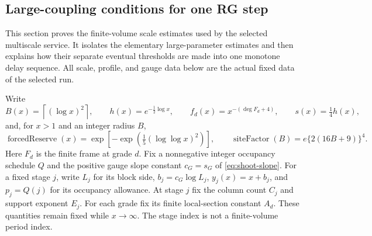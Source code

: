 \subsection{Large-coupling conditions for one RG step}
\label{ex-centered-geyser-scale-estimates}

This section proves the finite-volume scale estimates used by the selected multiscale service. It isolates the elementary large-parameter estimates and then explains how their separate eventual thresholds are made into one monotone delay sequence. All scale, profile, and gauge data below are the actual fixed data of the selected run.

Write
\[
 B(x)=\left\lceil(\log x)^2\right\rceil,\qquad
 h(x)=e^{-\frac12\log x},\qquad
 f_d(x)=x^{-\left(\deg F_d+4\right)},\qquad
 s(x)=\tfrac14h(x),
\]
and, for $x>1$ and an integer radius $B$,
\[
 \operatorname{forcedReserve}(x)=\exp\!\left[-\exp\!\left(\tfrac15(\log\log x)^2\right)\right],
 \qquad \operatorname{siteFactor}(B)=e\{2(16B+9)\}^4.
\]
Here $F_d$ is the finite frame at grade $d$. Fix a nonnegative integer occupancy schedule $Q$ and the positive gauge slope constant $c_G=s_G$ of \eqref{eq:shoot-slope}. For a fixed stage $j$, write $L_j$ for its block side, $b_j=c_G\log L_j$, $y_j(x)=x+b_j$, and $p_j=Q(j)$ for its occupancy allowance. At stage $j$ fix the column count $C_j$ and support exponent $E_j$. For each grade fix its finite local-section constant $A_d$. These quantities remain fixed while $x\to\infty$. The stage index is not a finite-volume period index.

